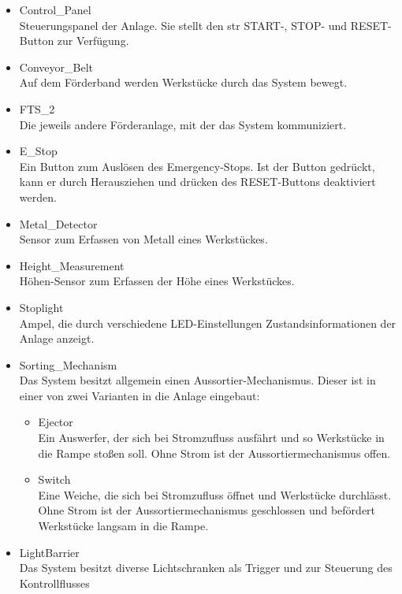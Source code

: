 \begin{itemize}
    \item Control\_Panel\\
    Steuerungspanel der Anlage.
    Sie stellt den \gls{str} START-, STOP- und RESET-Button zur Verfügung.

    \item Conveyor\_Belt\\
    Auf dem Förderband werden Werkstücke durch das System bewegt.
    \item FTS\_2\\
    Die jeweils andere Förderanlage, mit der das System kommuniziert.
    \item E\_Stop\\
    Ein Button zum Auslösen des Emergency-Stops. Ist der Button gedrückt, kann er durch Herausziehen und drücken des
    RESET-Buttons deaktiviert werden.
    \item Metal\_Detector\\
    Sensor zum Erfassen von Metall eines Werkstückes.
    \item Height\_Measurement\\
    Höhen-Sensor zum Erfassen der Höhe eines Werkstückes.
    \item Stoplight\\
    Ampel, die durch verschiedene LED-Einstellungen Zustandsinformationen der Anlage anzeigt.
    \item Sorting\_Mechanism\\
    Das System besitzt allgemein einen Aussortier-Mechanismus.
    Dieser ist in einer von zwei Varianten in die Anlage eingebaut:
    \begin{itemize}
        \item Ejector\\
        Ein Auswerfer, der sich bei Stromzufluss ausfährt und so Werkstücke in die Rampe stoßen soll.
        Ohne Strom ist der Aussortiermechanismus offen.
        \item Switch\\
        Eine Weiche, die sich bei Stromzufluss öffnet und Werkstücke durchlässt.
        Ohne Strom ist der Aussortiermechanismus geschlossen und befördert Werkstücke langsam in die Rampe.
    \end{itemize}
    \item LightBarrier\\
    Das System besitzt diverse Lichtschranken als Trigger und zur Steuerung des Kontrollflusses
    \begin{itemize}

\end{itemize}
\end{itemize}
